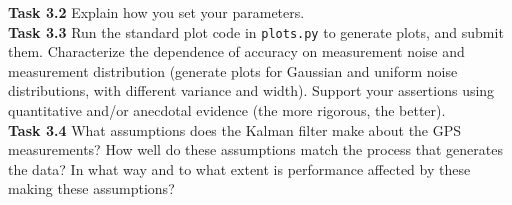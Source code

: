 \documentclass[a4paper]{article}
\theoremstyle{definition}
\theoremstyle{plain}
\begin{document}
\noindent
\textbf{Task 3.2} Explain how you set your parameters.\\

\noindent
\textbf{Task 3.3} Run the standard plot code in \texttt{plots.py} to generate plots, and submit them. Characterize the dependence of accuracy on measurement noise and measurement distribution (generate plots for Gaussian and uniform noise distributions, with different variance and width). Support your assertions using quantitative and/or anecdotal evidence (the more rigorous, the better).\\

\noindent
\textbf{Task 3.4} What assumptions does the Kalman filter make about the GPS measurements? How well do these assumptions match the process that generates the data? In what way and to what extent is performance affected by these making these assumptions?\\
\end{document}
